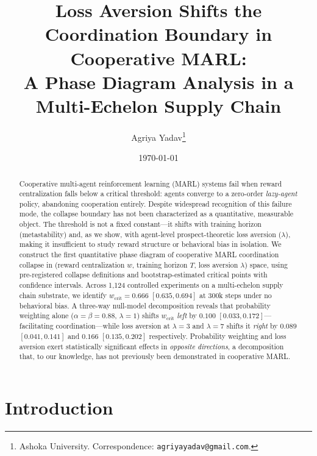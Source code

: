 \documentclass[11pt]{article}
\title{\textbf{Loss Aversion Shifts the Coordination Boundary in Cooperative MARL:\\
A Phase Diagram Analysis in a Multi-Echelon Supply Chain}}
\author{
Agriya Yadav\thanks{Ashoka University. Correspondence: \texttt{agriyayadav@gmail.com}.} \\
}
\date{\today}
\newcommand{\wcrit}{w_{\mathrm{crit}}}
\begin{document}
\maketitle

\begin{abstract}
Cooperative multi-agent reinforcement learning (MARL) systems fail when
reward centralization falls below a critical threshold: agents converge to
a zero-order \emph{lazy-agent} policy, abandoning cooperation entirely.
Despite widespread recognition of this failure mode, the collapse boundary
has not been characterized as a quantitative, measurable object.
The threshold is not a fixed constant---it shifts with training horizon
(metastability) and, as we show, with agent-level prospect-theoretic loss
aversion ($\lambda$), making it insufficient to study reward structure or
behavioral bias in isolation.
We construct the first quantitative phase diagram of cooperative MARL
coordination collapse in (reward centralization $w$, training horizon $T$,
loss aversion $\lambda$) space, using pre-registered collapse definitions
and bootstrap-estimated critical points with confidence intervals.
Across 1,124 controlled experiments on a multi-echelon supply chain
substrate, we identify $\wcrit = 0.666$ $[0.635, 0.694]$ at 300k steps
under no behavioral bias.
A three-way null-model decomposition reveals that probability weighting
alone ($\alpha{=}\beta{=}0.88$, $\lambda{=}1$) shifts $\wcrit$ \emph{left}
by $0.100$ $[0.033, 0.172]$---facilitating coordination---while loss
aversion at $\lambda{=}3$ and $\lambda{=}7$ shifts it \emph{right} by
$0.089$ $[0.041, 0.141]$ and $0.166$ $[0.135, 0.202]$ respectively.
Probability weighting and loss aversion exert statistically significant
effects in \emph{opposite directions}, a decomposition that, to our
knowledge, has not previously been demonstrated in cooperative MARL.
\end{abstract}

\section{Introduction}
\label{sec:intro}
\end{document}
